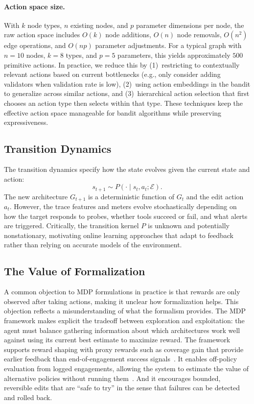 \documentclass[sigconf,anonymous]{acmart}
\begin{document}
\paragraph{Action space size.} With $k$ node types, $n$ existing nodes, and $p$ parameter dimensions per node, the raw action space includes $O(k)$ node additions, $O(n)$ node removals, $O(n^2)$ edge operations, and $O(np)$ parameter adjustments. For a typical graph with $n=10$ nodes, $k=8$ types, and $p=5$ parameters, this yields approximately $500$ primitive actions. In practice, we reduce this by (1)~restricting to contextually relevant actions based on current bottlenecks (e.g., only consider adding validators when validation rate is low), (2)~using action embeddings in the bandit to generalize across similar actions, and (3)~hierarchical action selection that first chooses an action type then selects within that type. These techniques keep the effective action space manageable for bandit algorithms while preserving expressiveness.

\subsection{Transition Dynamics}

The transition dynamics specify how the state evolves given the current state and action:
\begin{equation}
s_{t+1} \sim P(\cdot \mid s_t, a_t; \mathcal{E}).
\end{equation}
The new architecture $G_{t+1}$ is a deterministic function of $G_t$ and the edit action $a_t$. However, the trace features and meters evolve stochastically depending on how the target responds to probes, whether tools succeed or fail, and what alerts are triggered. Critically, the transition kernel $P$ is unknown and potentially nonstationary, motivating online learning approaches that adapt to feedback rather than relying on accurate models of the environment.

\subsection{The Value of Formalization}

A common objection to MDP formulations in practice is that rewards are only observed after taking actions, making it unclear how formalization helps. This objection reflects a misunderstanding of what the formalism provides. The MDP framework makes explicit the tradeoff between exploration and exploitation: the agent must balance gathering information about which architectures work well against using its current best estimate to maximize reward. The framework supports reward shaping with proxy rewards such as coverage gain that provide earlier feedback than end-of-engagement success signals~\cite{ng1999shaping}. It enables off-policy evaluation from logged engagements, allowing the system to estimate the value of alternative policies without running them~\cite{jiang2016doublyrobust}. And it encourages bounded, reversible edits that are ``safe to try'' in the sense that failures can be detected and rolled back.
\end{document}
